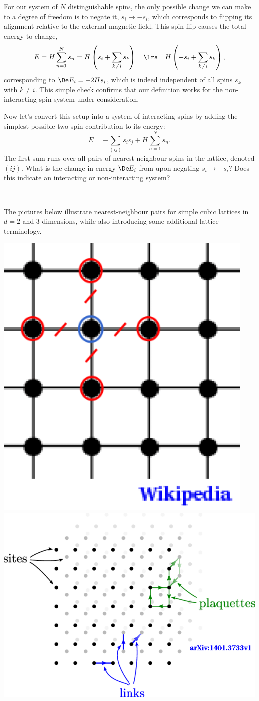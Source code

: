 For our system of $N$ distinguishable spins, the only possible change we can make to a degree of freedom is to negate it, $s_i \to -s_i$, which corresponds to flipping its alignment relative to the external magnetic field.
This spin flip causes the total energy to change,
\begin{equation*}
  E = H \sum_{n = 1}^N s_n = H\left(s_i + \sum_{k \ne i} s_k\right) \quad \lra \quad H\left(-s_i + \sum_{k \ne i} s_k\right),
\end{equation*}
corresponding to $\De E_i = -2H s_i$, which is indeed independent of all spins $s_k$ with $k \ne i$.
This simple check confirms that our definition works for the non-interacting spin system under consideration.

Now let's convert this setup into a system of interacting spins by adding the simplest possible two-spin contribution to its energy:
\begin{equation}
  \label{eq:Ising_energy}
  E = -\sum_{(ij)} s_i s_j + H \sum_{n = 1}^N s_n.
\end{equation}
The first sum runs over all pairs of nearest-neighbour spins in the lattice, denoted $(ij)$.
What is the change in energy $\De E_i$ from  upon negating $s_i \to -s_i$?
Does this indicate an interacting or non-interacting system?
\begin{mdframed}
  \ \\[100 pt]
\end{mdframed}
The pictures below illustrate nearest-neighbour pairs for simple cubic lattices in $d = 2$ and $3$ dimensions, while also introducing some additional lattice terminology.

\begin{center}
  \includegraphics[height=0.4\textwidth]{figs/unit09_lattice_2d.pdf}\hfill
  \includegraphics[height=0.4\textwidth]{figs/unit09_lattice_3d.pdf}
\end{center}

